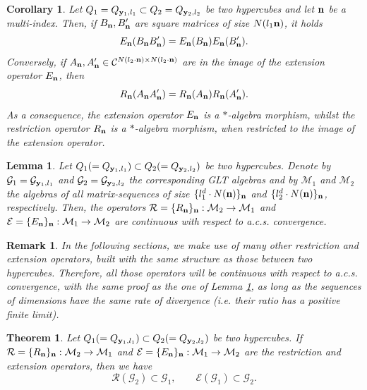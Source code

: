 \documentclass[10pt,a4paper]{amsart}
\newtheorem{thm}{Theorem}
\newtheorem{lem}{Lemma}
\newtheorem{cor}{Corollary}
\newtheorem{rem}{Remark}
\begin{document}
\begin{cor}\label{product_hypercubes}
     Let $Q_1=Q_{{\mathbf y_1},l_1}\subset Q_2=Q_{{\mathbf y_2},l_2}$ be two hypercubes and let $\mathbf n$ be a multi-index. Then, if $B_\mathbf n,B'_\mathbf n$ are square matrices of size $N(l_1\mathbf n)$, it holds
     \begin{equation*}
         E_\mathbf n(B_\mathbf n B'_\mathbf n)=E_\mathbf n(B_\mathbf n)E_\mathbf n(B'_\mathbf n).
     \end{equation*}
     Conversely, if $A_\mathbf n,A'_\mathbf n\in\mathcal{C}^{N(l_2\cdot\mathbf n)\times N(l_2\cdot\mathbf n)}$ are in the image of the extension operator $E_\mathbf n$, then
     \begin{equation*}
         R_\mathbf n(A_\mathbf n A'_\mathbf n)=R_\mathbf n(A_\mathbf n)R_\mathbf n(A'_\mathbf n).
     \end{equation*}
     As a consequence, the extension operator $E_\mathbf n$ is a $*$-algebra morphism, whilst the restriction operator $R_\mathbf n$ is a $*$-algebra morphism, when restricted to the image of the extension operator. 
\end{cor}

\begin{lem}\label{acs_cts_operators}
    Let $Q_1(=Q_{{\mathbf y_1},l_1})\subset Q_2(=Q_{{\mathbf y_2},l_2})$ be two hypercubes. Denote by $\mathcal{G}_1=\mathcal{G}_{{\mathbf y_1},l_1}$ and $\mathcal{G}_2=\mathcal{G}_{{\mathbf y_2},l_2}$ the corresponding GLT algebras and by $\mathcal{M}_1$ and $\mathcal{M}_2$ the algebras of all matrix-sequences of size $\{l_1^d\cdot N(\mathbf n)\}_\mathbf n$ and $\{l_2^d\cdot N(\mathbf n)\}_\mathbf n$, respectively. Then, the operators $\mathcal{R}=\{R_{\mathbf n}\}_\mathbf n:\mathcal{M}_2\to\mathcal{M}_1$ and $\mathcal{E}=\{E_{\mathbf n}\}_\mathbf n:\mathcal{M}_1\to\mathcal{M}_2$ are continuous with respect to a.c.s. convergence.
\end{lem}

\begin{rem}\label{acs_same_structure}
    In the following sections, we make use of many other restriction and extension operators, built with the same structure as those between two hypercubes. Therefore, all those operators will be continuous with respect to a.c.s. convergence, with the same proof as the one of Lemma \ref{acs_cts_operators}, as long as the sequences of dimensions have the same rate of divergence (i.e. their ratio has a positive finite limit). 
\end{rem}

\begin{thm}\label{restriction_of_standard_GLT}
	Let $Q_1(=Q_{{\mathbf y_1},l_1})\subset Q_2(=Q_{{\mathbf y_2},l_2})$ be two hypercubes.
    If $\mathcal{R}=\{R_{\mathbf n}\}_\mathbf n:\mathcal{M}_2\to\mathcal{M}_1$ and $\mathcal{E}=\{E_{\mathbf n}\}_\mathbf n:\mathcal{M}_1\to\mathcal{M}_2$ are the restriction and extension operators, then we have
	\begin{equation}\label{GLT_op}
		\mathcal{R}(\mathcal{G}_2)\subset\mathcal{G}_1, \qquad \mathcal{E}(\mathcal{G}_1)\subset\mathcal{G}_2.
	\end{equation}
\end{thm}
\end{document}
